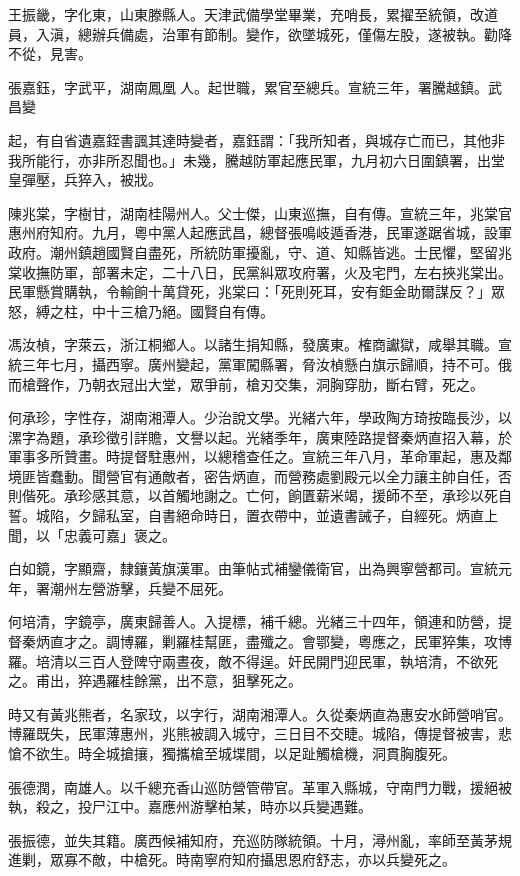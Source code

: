 \begin{pinyinscope}
王振畿，字化東，山東滕縣人。天津武備學堂畢業，充哨長，累擢至統領，改道員，入滇，總辦兵備處，治軍有節制。變作，欲墜城死，僅傷左股，遂被執。勸降不從，見害。

張嘉鈺，字武平，湖南鳳凰人。起世職，累官至總兵。宣統三年，署騰越鎮。武昌變

起，有自省遺嘉銍書諷其達時變者，嘉鈺謂：「我所知者，與城存亡而已，其他非我所能行，亦非所忍聞也。」未幾，騰越防軍起應民軍，九月初六日圍鎮署，出堂皇彈壓，兵猝入，被戕。

陳兆棠，字樹甘，湖南桂陽州人。父士傑，山東巡撫，自有傳。宣統三年，兆棠官惠州府知府。九月，粵中黨人起應武昌，總督張鳴岐遁香港，民軍遂踞省城，設軍政府。潮州鎮趙國賢自盡死，所統防軍擾亂，守、道、知縣皆逃。士民懼，堅留兆棠收撫防軍，部署未定，二十八日，民黨糾眾攻府署，火及宅門，左右挾兆棠出。民軍懸賞購執，令輸餉十萬貸死，兆棠曰：「死則死耳，安有鉅金助爾謀反？」眾怒，縛之柱，中十三槍乃絕。國賢自有傳。

馮汝楨，字萊云，浙江桐鄉人。以諸生捐知縣，發廣東。榷商讞獄，咸舉其職。宣統三年七月，攝西寧。廣州變起，黨軍闖縣署，脅汝楨懸白旗示歸順，持不可。俄而槍聲作，乃朝衣冠出大堂，眾爭前，槍刃交集，洞胸穿肋，斷右臂，死之。

何承珍，字性存，湖南湘潭人。少治說文學。光緒六年，學政陶方琦按臨長沙，以漯字為題，承珍徵引詳贍，文譽以起。光緒季年，廣東陸路提督秦炳直招入幕，於軍事多所贊畫。時提督駐惠州，以總稽查任之。宣統三年八月，革命軍起，惠及鄰境匪皆蠢動。聞營官有通敵者，密告炳直，而營務處劉殿元以全力讓主帥自任，否則偕死。承珍感其意，以首觸地謝之。亡何，餉匱薪米竭，援師不至，承珍以死自誓。城陷，夕歸私室，自書絕命時日，置衣帶中，並遺書誡子，自經死。炳直上聞，以「忠義可嘉」褒之。

白如鏡，字顯齋，隸鑲黃旗漢軍。由筆帖式補鑾儀衛官，出為興寧營都司。宣統元年，署潮州左營游擊，兵變不屈死。

何培清，字鏡亭，廣東歸善人。入提標，補千總。光緒三十四年，領連和防營，提督秦炳直才之。調博羅，剿羅桂幫匪，盡殲之。會鄂變，粵應之，民軍猝集，攻博羅。培清以三百人登陴守兩晝夜，敵不得逞。奸民開門迎民軍，執培清，不欲死之。甫出，猝遇羅桂餘黨，出不意，狙擊死之。

時又有黃兆熊者，名家玟，以字行，湖南湘潭人。久從秦炳直為惠安水師營哨官。博羅既失，民軍薄惠州，兆熊被調入城守，三日目不交睫。城陷，傳提督被害，悲愴不欲生。時全城搶攘，獨攜槍至城堞間，以足趾觸槍機，洞貫胸腹死。

張德潤，南雄人。以千總充香山巡防營管帶官。革軍入縣城，守南門力戰，援絕被執，殺之，投尸江中。嘉應州游擊柏某，時亦以兵變遇難。

張振德，並失其籍。廣西候補知府，充巡防隊統領。十月，潯州亂，率師至黃茅規進剿，眾寡不敵，中槍死。時南寧府知府攝思恩府舒志，亦以兵變死之。


\end{pinyinscope}
